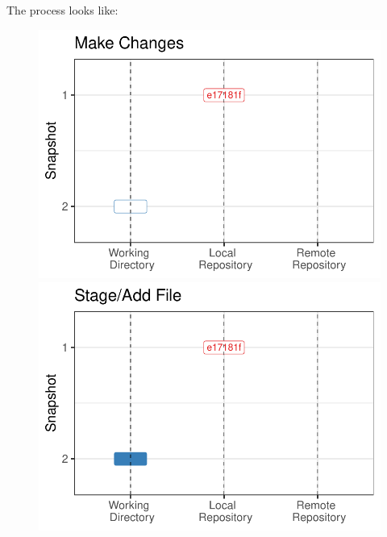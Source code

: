 \documentclass[
  letterpaper,
  DIV=11,
  numbers=noendperiod]{scrreprt}
\begin{document}
The process looks like:

\begin{figure}

\begin{minipage}[t]{0.50\linewidth}

{\centering 

\includegraphics{basics_files/figure-pdf/unnamed-chunk-7-1.pdf}

}

\end{minipage}%
%
\begin{minipage}[t]{0.50\linewidth}

{\centering 

\includegraphics{basics_files/figure-pdf/unnamed-chunk-8-1.pdf}

}
\end{minipage}
\end{figure}
\end{document}
